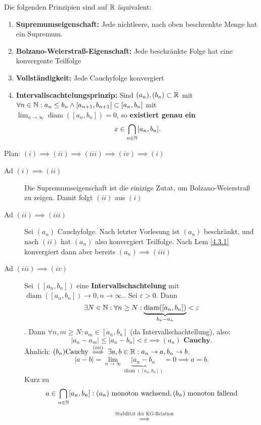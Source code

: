 \begin{subtheorem}
	Die folgenden Prinzipien sind auf $ \mathbb{R} $ äquivalent:
	\begin{enumerate}[label=(\roman*)]
		\item \textbf{Supremumseigenschaft:} Jede nichtleere, nach oben beschrenkte Menge hat ein Supremum.
		\item \textbf{Bolzano-Weierstraß-Eigenschaft:} Jede beschränkte Folge hat eine konvergente Teilfolge
		\item \textbf{Vollständigkeit:} Jede Cauchyfolge konvergiert
		\item \textbf{Intervallscachtelungsprinzip:} Sind $ (a_n), (b_n) \subset \mathbb{R} $ mit $ \forall n \in \mathbb{N} : a_n \leq b_n \wedge [a_{n+1}, b_{n+1}] \subset [a_n, b_n] $ mit
			$\lim_{n\to\infty} \operatorname{diam}([a_n, b_n]) = 0 $, so \textbf{existiert genau ein}
			\[ x \in \bigcap_{n\in\mathbb{N}}[a_n, b_n]. \]
	\end{enumerate}
	\begin{subproof*}
		Plan: $ (i) \implies (ii) \implies (iii) \implies (iv) \implies (i) $
		\begin{description}
			\item[Ad $ (i) \implies (ii) $] Die Supremumseigenschaft ist die einizige Zutat, um Bolzano-Wei\-er\-straß zu zeigen. Damit folgt $(ii)$ aus $(i)$
			\item[Ad $ (ii) \implies (iii) $] Sei $ (a_n) $ Cauchyfolge. Nach letzter Vorlesung ist $ ( a_n ) $ beschränkt, und nach $ (ii) $ hat $ (a_n ) $ also konvergiert Teilfolge. Nach Lem \ref{4.3.1} konvergiert dann aber bereits $ (a_n) \implies (iii) $
			\item[Ad $ (iii) \implies (iv)$] Sei $ ([a_n, b_n]) $ eine \textbf{Intervallschachtelung} mit $ \operatorname{diam}([a_n, b_n]) \to 0, n \to \infty. $. Sei $ \varepsilon > 0 $.
				Dann \[ \exists N \in \mathbb{N} : \forall n \geq N : \underbrace{\operatorname{diam}([a_n, b_n])}_{b_n - a_n} < \varepsilon \].
				Dann $ \forall n, m \geq N : a_m \in [a_n, b_n] $ (da Intervallschachtellung), also:
				\[ | a_n - a_m | \leq | a_n - b_n| < \varepsilon \implies (a_n) \textbf{ Cauchy}.\]
				Ähnlich: $ (b_n) \text{Cauchy} \overset{(iii)}{\implies} \exists a, b \in \mathbb{R}: a_n \to a, b_n \to b $.
				\[ | a- b| = \lim_{n\to\infty} \underbrace{|a_n -b_n}_{\operatorname{diam}([a_n, b_n])} = 0 \implies a = b. \]
				Kurz zu
				\[ a \in \bigcap_{n\in\mathbb{N}}[a_n, b_n] : (a_n) \text{ monoton wachsend}, (b_n) \text{ monoton fallend} \]
				\begin{align*}
					&\overset{\text{Stabilität der KG-Relation}}{\implies}

\end{align*}
\end{description}
\end{subproof*}
\end{subtheorem}
